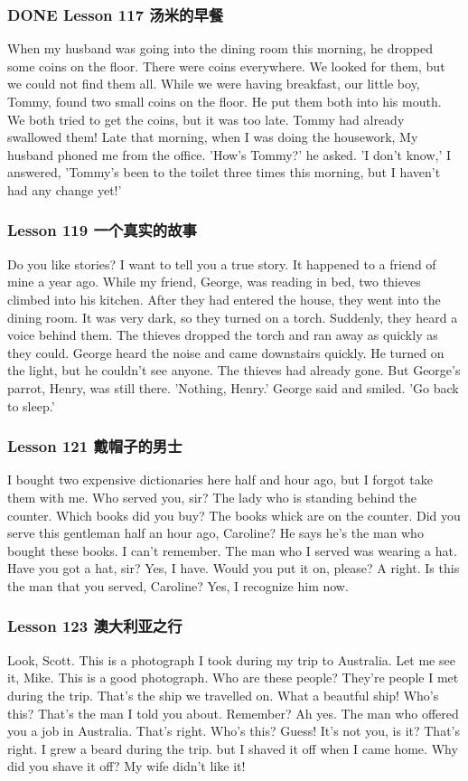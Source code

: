 \documentclass[11pt]{ctexart}
\begin{document}
\subsubsection{{\bfseries\sffamily DONE} Lesson 117 汤米的早餐}
\label{sec:org7ae1604}
When my husband was going into the dining room this morning,
he dropped some coins on the floor.
There were coins everywhere.
We looked for them, but we could not find them all.
While we were having breakfast, our little boy, Tommy, found two small coins on the floor.
He put them both into his mouth.
We both tried to get the coins, but it was too late.
Tommy had already swallowed them!
Late that morning, when I was doing the housework, My husband phoned me from the office.
'How's Tommy?' he asked.
'I don't know,' I answered,
'Tommy's been to the toilet three times this morning,
but I haven't had any change yet!'
\subsubsection{Lesson 119 一个真实的故事}
\label{sec:orga19e8fb}
Do you like stories?
I want to tell you a true story.
It happened to a friend of mine a year ago.
While my friend, George, was reading in bed, two thieves climbed into his kitchen.
After they had entered the house, they went into the dining room.
It was very dark, so they turned on a torch.
Suddenly, they heard a voice behind them.
The thieves dropped the torch and ran away as quickly as they could.
George heard the noise and came downstairs quickly.
He turned on the light, but he couldn't see anyone.
The thieves had already gone.
But George's parrot, Henry, was still there.
'Nothing, Henry.' George said and smiled.
'Go back to sleep.'
\subsubsection{Lesson 121 戴帽子的男士}
\label{sec:orge922065}
I bought two expensive dictionaries here half and hour ago,
but I forgot take them with me.
Who served you, sir?
The lady who is standing behind the counter.
Which books did you buy?
The books whick are on the counter.
Did you serve this gentleman half an hour ago, Caroline?
He says he's the man who bought these books.
I can't remember.
The man who I served was wearing a hat.
Have you got a hat, sir? Yes, I have.
Would you put it on, please? A right.
Is this the man that you served, Caroline?
Yes, I recognize him now.
\subsubsection{Lesson 123 澳大利亚之行}
\label{sec:org346d8b4}
Look, Scott.
This is a photograph I took during my trip to Australia.
Let me see it, Mike.
This is a good photograph.
Who are these people?
They're people I met during the trip.
That's the ship we travelled on.
What a beautful ship!
Who's this?
That's the man I told you about.
Remember?
Ah yes.
The man who offered you a job in Australia. That's right.
Who's this?
Guess!
It's not you, is it? That's right.
I grew a beard during the trip.
but I shaved it off when I came home.
Why did you shave it off?
My wife didn't like it!
\end{document}
